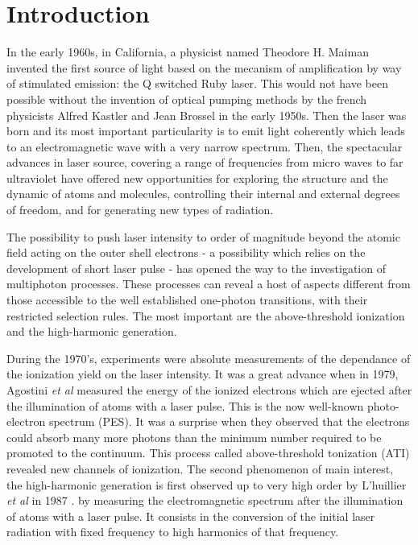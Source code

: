 \documentclass[a4paper]{article}
\begin{document}
\newpage
\unboldmath{\tableofcontents}
\newpage


\section{Introduction}

In the early 1960s, in California, a physicist named Theodore H. Maiman invented the first source of light based on the mecanism of amplification by way of stimulated emission: the Q switched Ruby laser. This would not have been possible without the invention of optical pumping methods by the french physicists Alfred Kastler and Jean Brossel in the early 1950s. Then the laser was born and its most important particularity is to emit light coherently which leads to an electromagnetic wave with a very narrow spectrum.
Then, the spectacular advances in laser source, covering a range of frequencies from micro waves to far ultraviolet have offered new opportunities for exploring the structure and the dynamic of atoms and molecules, controlling their internal and external degrees of freedom, and for generating new types of radiation. 
\par
The possibility to push laser intensity to order of magnitude beyond the atomic field acting on the outer shell electrons - a possibility which relies on the development of short laser pulse - has opened the way to the investigation of multiphoton processes. These processes can reveal a host of aspects different from those accessible to the well established one-photon transitions, with their restricted selection rules.
The most important are the above-threshold ionization and the high-harmonic generation.
\par
During the 1970's, experiments were absolute measurements of the dependance of the ionization yield on the laser intensity.
It was a great advance when in 1979, Agostini \textit{et al} \cite{Agostini_1979} measured the energy of the ionized electrons which are ejected after the illumination of atoms with a laser pulse. This is the now well-known photo-electron spectrum (PES). It was a surprise when they observed that the electrons could absorb many more photons than the minimum number required to be promoted to the continuum. This process called above-threshold tonization (ATI) revealed new channels of ionization.
The second phenomenon of main interest, the high-harmonic generation is first observed up to very high order by L'huillier \textit{et al} in 1987 \cite{Ferray_1988}. by measuring the electromagnetic spectrum after the illumination of atoms with a laser pulse. It consists in the conversion of the initial laser radiation with fixed frequency to high harmonics of that frequency.
\end{document}
